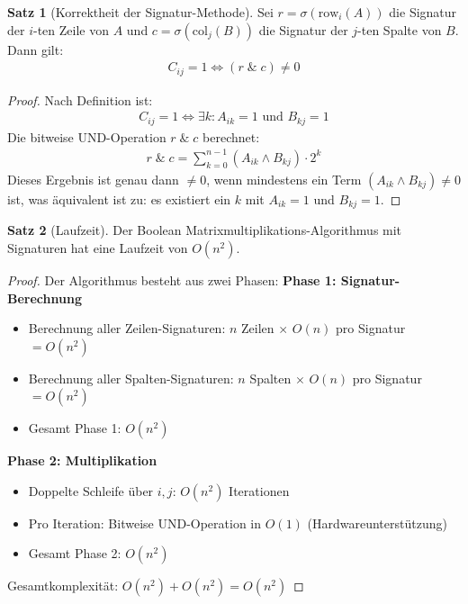 ﻿\documentclass[a4paper,12pt]{article}
\theoremstyle{definition}
\newtheorem{satz}{Satz}
\begin{document}
	\begin{satz}[Korrektheit der Signatur-Methode]
		Sei $r = \sigma(\text{row}_i(A))$ die Signatur der $i$-ten Zeile von $A$ und $c = \sigma(\text{col}_j(B))$ die Signatur der $j$-ten Spalte von $B$. Dann gilt:
		\begin{align}
			C_{ij} = 1 \Leftrightarrow (r \; \& \; c) \neq 0
		\end{align}
	\end{satz}
	
	\begin{proof}
		Nach Definition ist:
		\begin{align}
			C_{ij} = 1 \Leftrightarrow \exists k: A_{ik} = 1 \text{ und } B_{kj} = 1
		\end{align}
		Die bitweise UND-Operation $r \; \& \; c$ berechnet:
		\begin{align}
			r \; \& \; c = \sum_{k=0}^{n-1} (A_{ik} \wedge B_{kj}) \cdot 2^k
		\end{align}
		Dieses Ergebnis ist genau dann $\neq 0$, wenn mindestens ein Term $(A_{ik} \wedge B_{kj}) \neq 0$ ist, was äquivalent ist zu: es existiert ein $k$ mit $A_{ik} = 1$ und $B_{kj} = 1$.
	\end{proof}
	
	\begin{satz}[Laufzeit]
		Der Boolean Matrixmultiplikations-Algorithmus mit Signaturen hat eine Laufzeit von $O(n^2)$.
	\end{satz}
	
	\begin{proof}
		Der Algorithmus besteht aus zwei Phasen:\newline	
		\textbf{Phase 1: Signatur-Berechnung}
		\begin{itemize}
			\item[-] Berechnung aller Zeilen-Signaturen: $n$ Zeilen $\times$ $O(n)$ pro Signatur $= O(n^2)$
			\item[-] Berechnung aller Spalten-Signaturen: $n$ Spalten $\times$ $O(n)$ pro Signatur $= O(n^2)$
			\item[-] Gesamt Phase 1: $O(n^2)$
		\end{itemize}
		\textbf{Phase 2: Multiplikation}
		\begin{itemize}
			\item[-] Doppelte Schleife über $i, j$: $O(n^2)$ Iterationen
			\item[-] Pro Iteration: Bitweise UND-Operation in $O(1)$ (Hardwareunterstützung)
			\item[-] Gesamt Phase 2: $O(n^2)$
		\end{itemize}
		Gesamtkomplexität: $O(n^2) + O(n^2) = O(n^2)$
	\end{proof}
	
\end{document}
